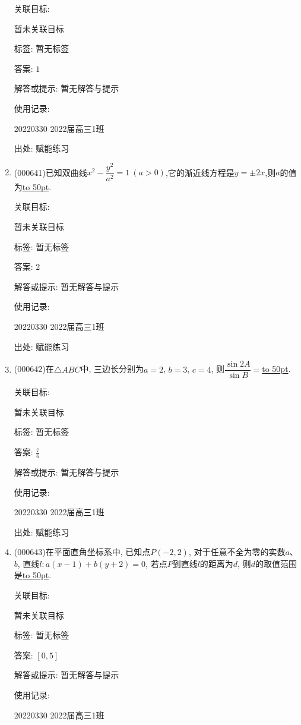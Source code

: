 \documentclass[10pt,a4paper]{article}
\newcommand{\blank}[1]{\underline{\hbox to #1pt{}}}
\begin{document}
\begin{enumerate}[1.]
关联目标:

暂未关联目标



标签: 暂无标签

答案: $1$

解答或提示: 暂无解答与提示

使用记录:

20220330	2022届高三1班	


出处: 赋能练习
\item { (000641)}已知双曲线$x^2-\dfrac{y^2}{a^2}=1 \ (a>0)$,它的渐近线方程是$y=\pm 2x$,则$a$的值为\blank{50}.


关联目标:

暂未关联目标



标签: 暂无标签

答案: $2$

解答或提示: 暂无解答与提示

使用记录:

20220330	2022届高三1班	


出处: 赋能练习
\item { (000642)}在$\triangle ABC$中, 三边长分别为$a=2$, $b=3$, $c=4$, 则$\dfrac{\sin 2A}{\sin B}=$\blank{50}.


关联目标:

暂未关联目标



标签: 暂无标签

答案: $\frac 76$

解答或提示: 暂无解答与提示

使用记录:

20220330	2022届高三1班	


出处: 赋能练习
\item { (000643)}在平面直角坐标系中, 已知点$P(-2,2)$, 对于任意不全为零的实数$a$、$b$, 直线$l:a(x-1)+b(y+2)=0$, 若点$P$到直线$l$的距离为$d$, 则$d$的取值范围是\blank{50}.


关联目标:

暂未关联目标



标签: 暂无标签

答案: $[0,5]$

解答或提示: 暂无解答与提示

使用记录:

20220330	2022届高三1班	



\end{enumerate}
\end{document}
